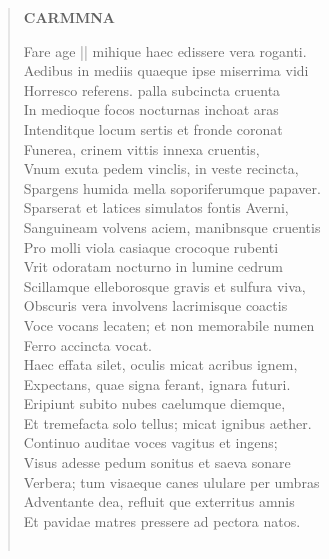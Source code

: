 \documentclass[11pt, a4paper]{report}
\begin{document}
\begin{verse}
    \begin{center} \textbf{CARMMNA} \end{center} \marginpar{[4]} Fare age || mihique haec edissere vera roganti. \\ Aedibus in mediis quaeque ipse miserrima vidi \\ Horresco referens. palla subcincta cruenta \\ In medioque focos nocturnas inchoat aras \\ Intenditque locum sertis et fronde coronat \\ Funerea, crinem vittis innexa cruentis, \\ Vnum exuta pedem vinclis, in veste recincta, \\ Spargens humida mella soporiferumque papaver. \\ Sparserat et latices simulatos fontis Averni, \\ Sanguineam volvens aciem, manibnsque cruentis \\ Pro molli viola casiaque crocoque rubenti \\ Vrit odoratam nocturno in lumine cedrum \\ Scillamque elleborosque gravis et sulfura viva, \\ Obscuris vera involvens lacrimisque coactis \\ Voce vocans lecaten; et non memorabile numen \\ Ferro accincta vocat. \\ Haec effata silet, oculis micat acribus ignem, \\ Expectans, quae signa ferant, ignara futuri. \\ Eripiunt subito nubes caelumque diemque, \\ Et tremefacta solo tellus; micat ignibus aether. \\ Continuo auditae voces vagitus et ingens; \\ Visus adesse pedum sonitus et saeva sonare \\ Verbera;  \lbrack tum \rbrack  visaeque canes ululare per umbras \\ Adventante dea, refluit \lbrack que \rbrack  exterritus amnis \\ Et pavidae matres pressere ad pectora natos. \\ 
        ﻿\pagebreak 

\end{verse}
\end{document}
